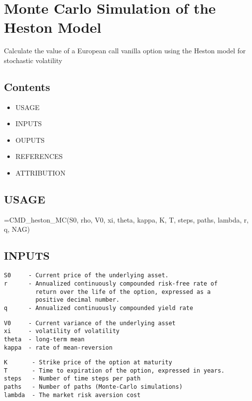 
    
\section*{Monte Carlo Simulation of the Heston Model}

\begin{par}
Calculate the value of a European call vanilla option using the Heston model for stochastic volatility
\end{par} \vspace{1em}

\subsection*{Contents}

\begin{itemize}
\setlength{\itemsep}{-1ex}
   \item USAGE
   \item INPUTS
   \item OUPUTS
   \item REFERENCES
   \item ATTRIBUTION
\end{itemize}


\subsection*{USAGE}

\begin{par}
=CMD\_heston\_MC(S0, rho, V0, xi, theta, kappa, K, T, steps, paths, lambda, r, q, NAG)
\end{par} \vspace{1em}


\subsection*{INPUTS}

\begin{verbatim}S0     - Current price of the underlying asset.
r      - Annualized continuously compounded risk-free rate of 
         return over the life of the option, expressed as a 
         positive decimal number.
q      - Annualized continuously compounded yield rate\end{verbatim}
\begin{verbatim}V0     - Current variance of the underlying asset
xi     - volatility of volatility
theta  - long-term mean
kappa  - rate of mean-reversion\end{verbatim}
\begin{verbatim}
K       - Strike price of the option at maturity
T       - Time to expiration of the option, expressed in years.
steps   - Number of time steps per path
paths   - Number of paths (Monte-Carlo simulations)
lambda  - The market risk aversion cost\end{verbatim}


